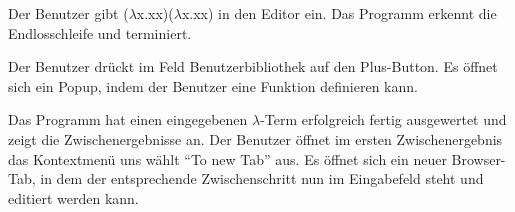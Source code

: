 \documentclass[parskip=full,11pt,twoside]{scrartcl}
\begin{document}
{Der Benutzer gibt ($\lambda$x.xx)($\lambda$x.xx) in den Editor ein.}
{Das Programm erkennt die Endlosschleife und terminiert.}

{Der Benutzer drückt im Feld Benutzerbibliothek auf den Plus-Button.}
{Es öffnet sich ein Popup, indem der Benutzer eine Funktion definieren kann.}

\teststep
{Das Programm hat einen eingegebenen $\lambda$-Term erfolgreich fertig ausgewertet und zeigt die Zwischenergebnisse an.}
{Der Benutzer öffnet im ersten Zwischenergebnis das Kontextmenü uns wählt \enquote{To new Tab} aus.}
{Es öffnet sich ein neuer Browser-Tab, in dem der entsprechende Zwischenschritt nun im Eingabefeld steht und editiert werden kann.}





\newpage
\end{document}
